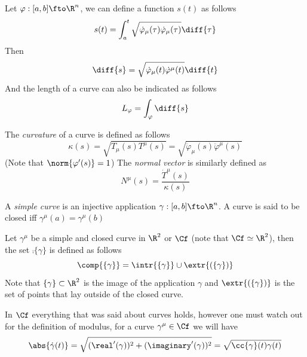 \documentclass[../mmf.tex]{subfiles}
\begin{document}
\begin{dfn}
	Let $\varphi:[a,b]\fto\R^n$, we can define a function $s(t)$ as follows
	\begin{equation}
		s(t)=\int_{a}^{t}\sqrt{\dot{\varphi}_\mu(\tau)\dot{\varphi}_\mu(\tau)}\diff{\tau}
		\label{eq:curvcoord}
	\end{equation}
	Then
	\begin{equation}
		\diff{s}=\sqrt{\dot{\varphi}_\mu(t)\dot{\varphi}^\mu(t)}\diff{t}
		\label{eq:diffcurvcoord}
	\end{equation}
	And the length of a curve can also be indicated as follows
	\begin{equation}
		L_\varphi=\int_\varphi\diff{s}
		\label{eq:curvelength2}
	\end{equation}
\end{dfn}
\begin{dfn}
	The \textit{curvature} of a curve is defined as follows
	\begin{equation}
		\kappa(s)=\sqrt{T_\mu(s)T^\mu(s)}=\sqrt{\ddot{\varphi}_\mu(s)\ddot{\varphi}^\mu(s)}
		\label{eq:curvature}
	\end{equation}
	(Note that $\norm{\varphi'(s)}=1$)
	The \textit{normal vector} is similarly defined as
	\begin{equation}
		N^\mu(s)=\frac{\dot{T}^\mu(s)}{\kappa(s)}
		\label{eq:normalcurve}
	\end{equation}
\end{dfn}
\begin{dfn}
	A \textit{simple curve} is an injective application $\gamma:[a,b]\fto\R^n$. A curve is said to be closed iff $\gamma^\mu(a)=\gamma^\mu(b)$
\end{dfn}
\begin{thm}
	Let $\gamma^\mu$ be a simple and closed curve in $\R^2$ or $\Cf$ (note that $\Cf\simeq\R^2$), then the set $\comp{\{\gamma\}}$ is defined as follows
	\begin{equation}
		\comp{\{\gamma\}}=\intr{\{\gamma\}}\cup\extr{(\{\gamma\})}
		\label{eq:jordanthm}
	\end{equation}
	Note that $\{\gamma\}\subset\R^2$ is the image of the application $\gamma$ and $\extr{(\{\gamma\})}$ is the set of points that lay outside of the closed curve.
\end{thm}
In $\Cf$ everything that was said about curves holds, however one must watch out for the definition of modulus, for a curve $\gamma^\mu\in\Cf$ we will have
\begin{equation}
	\abs{\dot{\gamma}(t)}=\sqrt{(\real'(\gamma))^2+(\imaginary'(\gamma))^2}=\sqrt{\cc{\gamma}(t)\gamma(t)}
	\label{eq:abscfgamma}
\end{equation}
\end{document}
